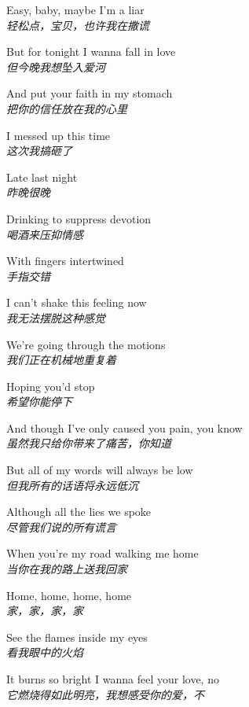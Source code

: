 \begin{spacing}{1.5}
\begin{flushleft}
Easy, baby, maybe I'm a liar\\
\textit{轻松点，宝贝，也许我在撒谎}\lyricspace

But for tonight I wanna fall in love\\
\textit{但今晚我想坠入爱河}\lyricspace

And put your faith in my stomach\\
\textit{把你的信任放在我的心里}\lyricspace

I messed up this time\\
\textit{这次我搞砸了}\lyricspace

Late last night\\
\textit{昨晚很晚}\lyricspace

Drinking to suppress devotion\\
\textit{喝酒来压抑情感}\lyricspace

With fingers intertwined\\
\textit{手指交错}\lyricspace

I can't shake this feeling now\\
\textit{我无法摆脱这种感觉}\lyricspace

We're going through the motions\\
\textit{我们正在机械地重复着}\lyricspace

Hoping you'd stop\\
\textit{希望你能停下}\lyricspace

And though I've only caused you pain, you know\\
\textit{虽然我只给你带来了痛苦，你知道}\lyricspace

But all of my words will always be low\\
\textit{但我所有的话语将永远低沉}\lyricspace

Although all the lies we spoke\\
\textit{尽管我们说的所有谎言}\lyricspace

When you're my road walking me home\\
\textit{当你在我的路上送我回家}\lyricspace

Home, home, home, home\\
\textit{家，家，家，家}\lyricspace

See the flames inside my eyes\\
\textit{看我眼中的火焰}\lyricspace

It burns so bright I wanna feel your love, no\\
\textit{它燃烧得如此明亮，我想感受你的爱，不}\lyricspace


\end{flushleft}
\end{spacing}
